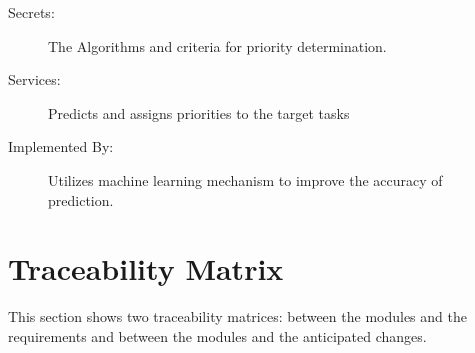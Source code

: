 \documentclass[12pt, titlepage]{article}
\begin{document}
\begin{description}
\item[Secrets:] The Algorithms and criteria for priority determination.
\item[Services:] Predicts and assigns priorities to the target tasks
\item[Implemented By:] Utilizes machine learning mechanism to improve the accuracy of prediction. 
\end{description}
\section{Traceability Matrix} \label{SecTM}

This section shows two traceability matrices: between the modules and the
requirements and between the modules and the anticipated changes.
\end{document}
